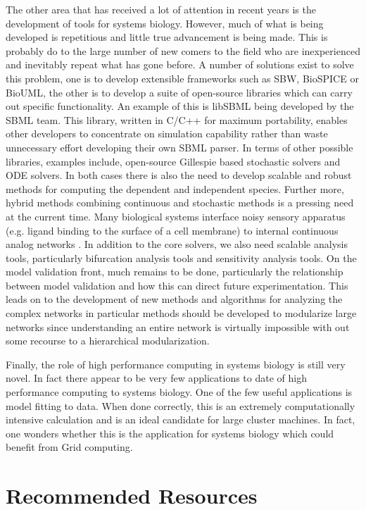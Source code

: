 \documentclass[12pt]{article}
\begin{document}
{The other area that has received a lot of attention in recent years is the development of tools for systems biology. However, much of what is being developed is repetitious and little true advancement is being made. This is probably do to the large number of new comers to the field who are inexperienced and inevitably repeat what has gone before. A number of solutions exist to solve this problem, one is to develop extensible frameworks such as SBW, BioSPICE or BioUML, the other is to develop a suite of open-source libraries which can carry out specific functionality. An example of this is libSBML being developed by the SBML team. This library, written in C/C++ for maximum portability, enables other developers to concentrate on simulation capability rather than waste unnecessary effort developing their own SBML parser.  In terms of other possible libraries, examples include, open-source Gillespie based stochastic solvers and ODE solvers. In both cases there is also the need to develop scalable and robust methods for computing the dependent and independent species. Further more, hybrid methods combining continuous and stochastic methods is a pressing need at the current time. Many biological systems interface noisy sensory apparatus (e.g. ligand binding to the surface of a cell membrane) to internal continuous analog networks \cite{SauroReview:2004}. In addition to the core solvers, we also need scalable analysis tools, particularly bifurcation analysis tools and sensitivity analysis tools. On the model validation front, much remains to be done, particularly the relationship between model validation and how this can direct future experimentation. This leads on to the development of new methods and algorithms for analyzing the complex networks in particular methods should be developed to modularize large networks since understanding an entire network is virtually impossible with out some recourse to a hierarchical modularization.

Finally, the role of high performance computing in systems biology is still very novel. In fact there appear to be very few applications to date of high performance computing to systems biology. One of the few useful applications is model fitting to data. When done correctly, this is an extremely computationally intensive calculation and is an ideal candidate for large cluster machines. In fact, one wonders whether this is the application for systems biology which could benefit from Grid computing.

\section{Recommended Resources}

}
\end{document}
